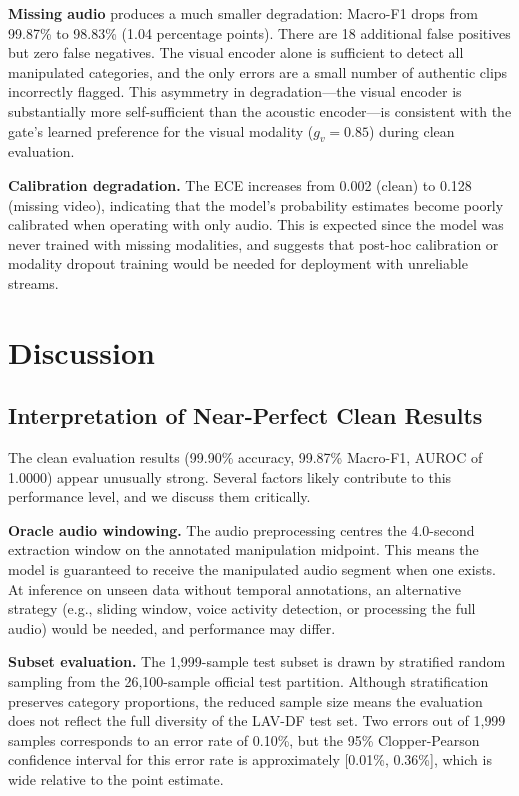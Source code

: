 \documentclass[conference]{IEEEtran}
\begin{document}
\textbf{Missing audio} produces a much smaller degradation: Macro-F1 drops from 99.87\% to 98.83\% (1.04 percentage points). There are 18 additional false positives but zero false negatives. The visual encoder alone is sufficient to detect all manipulated categories, and the only errors are a small number of authentic clips incorrectly flagged. This asymmetry in degradation---the visual encoder is substantially more self-sufficient than the acoustic encoder---is consistent with the gate's learned preference for the visual modality ($g_v = 0.85$) during clean evaluation.

\textbf{Calibration degradation.} The ECE increases from 0.002 (clean) to 0.128 (missing video), indicating that the model's probability estimates become poorly calibrated when operating with only audio. This is expected since the model was never trained with missing modalities, and suggests that post-hoc calibration or modality dropout training would be needed for deployment with unreliable streams.

\section{Discussion}
\label{sec:discussion}

\subsection{Interpretation of Near-Perfect Clean Results}

The clean evaluation results (99.90\% accuracy, 99.87\% Macro-F1, AUROC of 1.0000) appear unusually strong. Several factors likely contribute to this performance level, and we discuss them critically.

\textbf{Oracle audio windowing.} The audio preprocessing centres the 4.0-second extraction window on the annotated manipulation midpoint. This means the model is guaranteed to receive the manipulated audio segment when one exists. At inference on unseen data without temporal annotations, an alternative strategy (e.g., sliding window, voice activity detection, or processing the full audio) would be needed, and performance may differ.

\textbf{Subset evaluation.} The 1{,}999-sample test subset is drawn by stratified random sampling from the 26{,}100-sample official test partition. Although stratification preserves category proportions, the reduced sample size means the evaluation does not reflect the full diversity of the LAV-DF test set. Two errors out of 1{,}999 samples corresponds to an error rate of 0.10\%, but the 95\% Clopper-Pearson confidence interval for this error rate is approximately [0.01\%, 0.36\%], which is wide relative to the point estimate.
\end{document}
